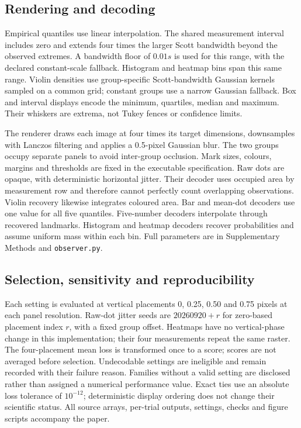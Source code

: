\documentclass[11pt]{article}
\begin{document}
\subsection*{Rendering and decoding}
Empirical quantiles use linear interpolation. The shared measurement interval includes zero and extends four times the larger Scott bandwidth beyond the observed extremes. A bandwidth floor of $0.01s$ is used for this range, with the declared constant-scale fallback. Histogram and heatmap bins span this same range. Violin densities use group-specific Scott-bandwidth Gaussian kernels sampled on a common grid; constant groups use a narrow Gaussian fallback. Box and interval displays encode the minimum, quartiles, median and maximum. Their whiskers are extrema, not Tukey fences or confidence limits.

The renderer draws each image at four times its target dimensions, downsamples with Lanczos filtering and applies a 0.5-pixel Gaussian blur. The two groups occupy separate panels to avoid inter-group occlusion. Mark sizes, colours, margins and thresholds are fixed in the executable specification. Raw dots are opaque, with deterministic horizontal jitter. Their decoder uses occupied area by measurement row and therefore cannot perfectly count overlapping observations. Violin recovery likewise integrates coloured area. Bar and mean-dot decoders use one value for all five quantiles. Five-number decoders interpolate through recovered landmarks. Histogram and heatmap decoders recover probabilities and assume uniform mass within each bin. Full parameters are in Supplementary Methods and \texttt{observer.py}.

\subsection*{Selection, sensitivity and reproducibility}
Each setting is evaluated at vertical placements 0, 0.25, 0.50 and 0.75 pixels at each panel resolution. Raw-dot jitter seeds are $20260920+r$ for zero-based placement index $r$, with a fixed group offset. Heatmaps have no vertical-phase change in this implementation; their four measurements repeat the same raster. The four-placement mean loss is transformed once to a score; scores are not averaged before selection. Undecodable settings are ineligible and remain recorded with their failure reason. Families without a valid setting are disclosed rather than assigned a numerical performance value. Exact ties use an absolute loss tolerance of $10^{-12}$; deterministic display ordering does not change their scientific status. All source arrays, per-trial outputs, settings, checks and figure scripts accompany the paper.
\end{document}
